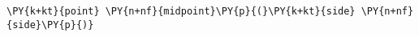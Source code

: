 \begin{Verbatim}[commandchars=\\\{\}]
    \PY{k+kt}{point} \PY{n+nf}{midpoint}\PY{p}{(}\PY{k+kt}{side} \PY{n+nf}{side}\PY{p}{)}
\end{Verbatim}
